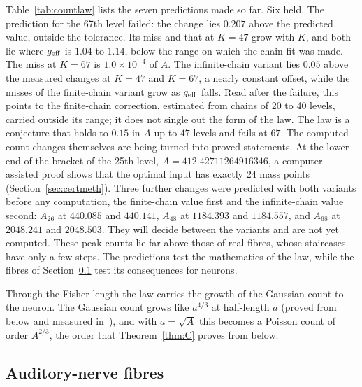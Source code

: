 \documentclass[10pt,letterpaper]{article}
\begin{document}
Table~\ref{tab:countlaw} lists the seven predictions made so far. Six held. The prediction for the 67th level failed: the
change lies $0.207$ above the predicted value, outside the tolerance. Its miss and that at $K=47$ grow with $K$, and both lie where
$g_{\rm eff}$ is $1.04$ to $1.14$, below the range on which the chain fit was made. The miss at $K=67$ is $1.0\times10^{-4}$ of $A$.
The infinite-chain variant lies $0.05$ above the measured changes at $K=47$ and $K=67$, a nearly constant offset, while the misses of the finite-chain
variant grow as $g_{\rm eff}$ falls. Read after the failure, this points to the finite-chain correction, estimated from chains of 20 to 40
levels, carried outside its range; it does not single out the form of the law. The law is a conjecture that holds to $0.15$ in $A$
up to $47$ levels and fails at $67$. The computed count changes themselves are being turned into proved statements. At the lower
end of the bracket of the 25th level, $A=412.42711264916346$, a computer-assisted proof shows that the optimal
input has exactly 24 mass points (Section~\ref{sec:certmeth}). Three further
changes were predicted with both variants before any computation, the finite-chain value first and the infinite-chain value second:
$A_{26}$ at $440.085$ and $440.141$, $A_{48}$ at $1184.393$ and
$1184.557$, and $A_{68}$ at $2048.241$ and $2048.503$. They will decide between the variants and are not yet computed. These peak counts lie far above those of real fibres, whose
staircases have only a few steps. The predictions test the mathematics of the law, while the fibres of Section~\ref{sec:an} test its
consequences for neurons.

Through the Fisher length the law carries the growth of the Gaussian count to the neuron. The Gaussian count grows like $a^{4/3}$ at
half-length $a$ (proved from below and measured in~\cite{Paper1}), and with $a=\sqrt A$ this becomes a Poisson count of order $A^{2/3}$, the order that Theorem~\ref{thm:C} proves from below.


\subsection{Auditory-nerve fibres}\label{sec:an}
\end{document}
